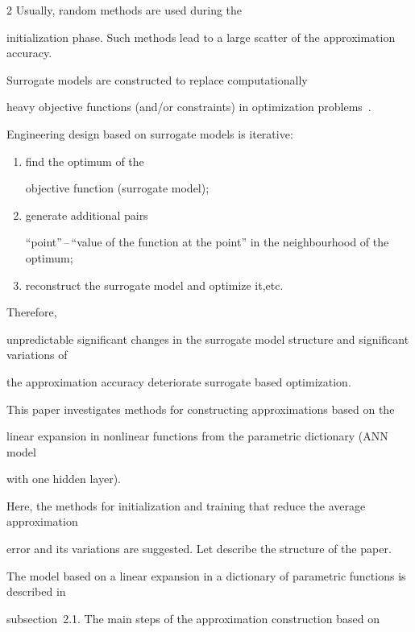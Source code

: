 \begin{multicols}{2}
  Usually, random methods are used during the 

 initialization phase. Such methods lead to a large scatter of the approximation accuracy.

 Surrogate models are constructed to replace computationally 

 heavy objective functions (and/or constraints) in optimization problems~\cite{copti}. 

 Engineering design based on surrogate models is iterative:

 \begin{enumerate}[(1)]

 \item  find the optimum of the 

 objective function (surrogate model);\\[-9pt]

 \item  generate additional pairs

   ``point''\,--\,``value of the function at the point'' in the neighbourhood of the optimum;\\[-9pt] 

\item reconstruct the surrogate model and optimize it,\linebreak etc.

\end{enumerate}

 Therefore, 

  unpredictable significant changes in the surrogate model structure and significant variations of 

  the approximation accuracy deteriorate surrogate based optimization.



This paper investigates methods for constructing approximations based on the 

linear expansion in nonlinear functions from the parametric dictionary (ANN model 

with one hidden layer).

Here, the methods for initialization and training that reduce the average approximation 

error and its variations are suggested. Let describe the structure of the paper.



The model based on a linear expansion in a dictionary of parametric functions is described in 

subsection~2.1. The main steps of the approximation construction based on


\end{multicols}
